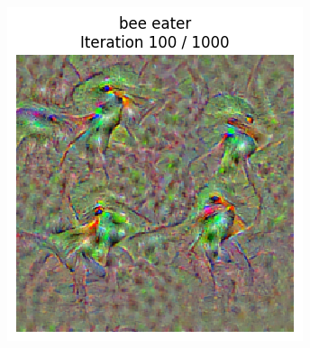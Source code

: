 \begin{figure}[H]
    \centering
    \begin{subfigure}[t]{.25\textwidth}
        \centering
        \includegraphics[width=\linewidth]{figs_propre2/SqueezeNet/SqueezeNet_bird_animated_1000_blur_100_frame.png}
        \caption{}
        \label{fig:class_viz_iter:sub1}
    \end{subfigure}%
    \begin{subfigure}[t]{.25\textwidth}
        \centering

\end{subfigure}
\end{figure}
